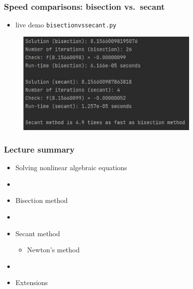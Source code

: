 \documentclass[english,14pt]{beamer}
\begin{document}
\begin{frame}[fragile]

\frametitle{Speed comparisons: bisection vs.~secant}

\begin{itemize}
	\item live demo \texttt{bisectionvssecant.py}
\end{itemize}

\begin{figure}[ht]
	\centering
	\includegraphics[width=0.8\textwidth]{figures/BisectionSecantSpeed}
\end{figure}

\end{frame}

%
%
%
%


\begin{frame}[fragile]

\frametitle{Lecture summary}
\begin{itemize}
	\item Solving nonlinear algebraic equations

	\item[]
	
	\item Bisection method

	\item[]
	
	\item Secant method
	\begin{itemize}
		\item Newton's method
	\end{itemize}

	\item[]
	
	\item Extensions
	
\end{itemize}

\end{frame}
\end{document}

